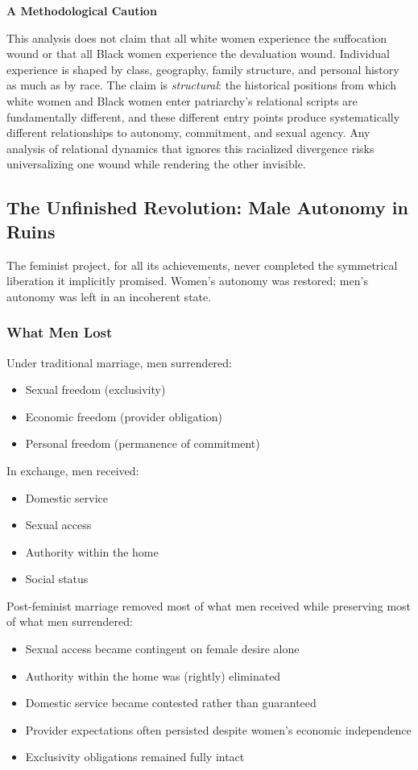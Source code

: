 \documentclass[12pt, letterpaper]{article}
\begin{document}
\textbf{A Methodological Caution}

This analysis does not claim that all white women experience the suffocation wound or that all Black women experience the devaluation wound. Individual experience is shaped by class, geography, family structure, and personal history as much as by race. The claim is \textit{structural}: the historical positions from which white women and Black women enter patriarchy's relational scripts are fundamentally different, and these different entry points produce systematically different relationships to autonomy, commitment, and sexual agency. Any analysis of relational dynamics that ignores this racialized divergence risks universalizing one wound while rendering the other invisible.

\subsection{The Unfinished Revolution: Male Autonomy in Ruins}

The feminist project, for all its achievements, never completed the symmetrical liberation it implicitly promised. Women's autonomy was restored; men's autonomy was left in an incoherent state.

\subsubsection{What Men Lost}

Under traditional marriage, men surrendered:
\begin{itemize}
    \item Sexual freedom (exclusivity)
    \item Economic freedom (provider obligation)
    \item Personal freedom (permanence of commitment)
\end{itemize}

In exchange, men received:
\begin{itemize}
    \item Domestic service
    \item Sexual access
    \item Authority within the home
    \item Social status
\end{itemize}

Post-feminist marriage removed most of what men received while preserving most of what men surrendered:
\begin{itemize}
    \item Sexual access became contingent on female desire alone
    \item Authority within the home was (rightly) eliminated
    \item Domestic service became contested rather than guaranteed
    \item Provider expectations often persisted despite women's economic independence
    \item Exclusivity obligations remained fully intact
\end{itemize}
\end{document}
